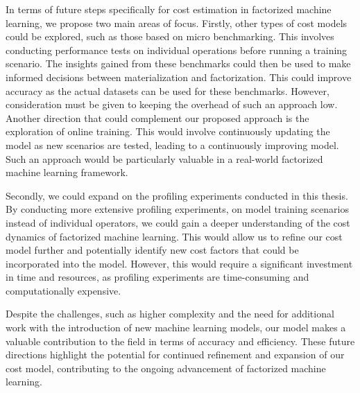 In terms of future steps specifically for cost estimation in factorized machine learning, we propose two main areas of focus. Firstly, other types of cost models could be explored, such as those based on micro benchmarking. This involves conducting performance tests on individual operations before running a training scenario. The insights gained from these benchmarks could then be used to make informed decisions between materialization and factorization. This could improve accuracy as the actual datasets can be used for these benchmarks. However, consideration must be given to keeping the overhead of such an approach low. Another direction that could complement our proposed approach is the exploration of online training. This would involve continuously updating the model as new scenarios are tested, leading to a continuously improving model. Such an approach would be particularly valuable in a real-world factorized machine learning framework.

Secondly, we could expand on the profiling experiments conducted in this thesis. By conducting more extensive profiling experiments, on model training scenarios instead of individual operators, we could gain a deeper understanding of the cost dynamics of factorized machine learning. This would allow us to refine our cost model further and potentially identify new cost factors that could be incorporated into the model. However, this would require a significant investment in time and resources, as profiling experiments are time-consuming and computationally expensive.

Despite the challenges, such as higher complexity and the need for additional work with the introduction of new machine learning models, our model makes a valuable contribution to the field in terms of accuracy and efficiency. These future directions highlight the potential for continued refinement and expansion of our cost model, contributing to the ongoing advancement of factorized machine learning.